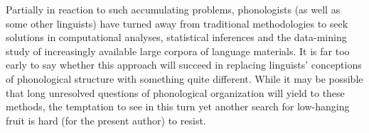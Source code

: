 Partially in reaction to such accumulating problems, phonologists
(as well as some other linguists) have turned away from traditional
methodologies to seek solutions in computational analyses, statistical
inferences and the data-mining study of increasingly available large
corpora of language materials. It is far too early to say whether this
approach will succeed in replacing linguists' conceptions of
phonological structure with something quite different. While it may be
possible that long unresolved questions of phonological organization
will yield to these methods, the temptation to see in this turn yet
another search for low-hanging fruit is hard (for the present author)
to resist.


 
